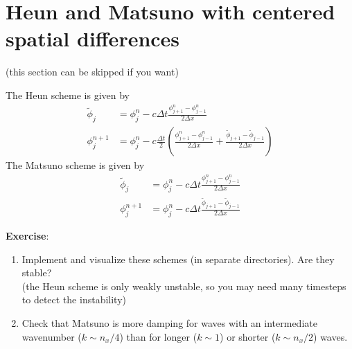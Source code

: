 \documentclass[a4paper]{article}
\begin{document}
\section{Heun and Matsuno with centered spatial differences}
%
\par
(this section can be skipped if you want)
%
\par
The Heun scheme is given by
%
\begin{align*}
	\tilde \phi_j&=\phi_j^n-c\Delta t\frac{\phi^n_{j+1}-\phi^n_{j-1}}{2\Delta x}\\
	\phi^{n+1}_{j}&=\phi_j^n-c\frac{\Delta t}{2}\left(\frac{\phi^n_{j+1}-\phi^n_{j-1}}{2\Delta x}+\frac{\tilde \phi_{j+1}-\tilde \phi_{j-1}}{2\Delta x}\right)
\end{align*}
%
The Matsuno scheme is given by
%
\begin{align*}
	\tilde \phi_j&=\phi_j^n-c\Delta t\frac{\phi^n_{j+1}-\phi^n_{j-1}}{2\Delta x}\\
	\phi^{n+1}_{j}&=\phi_j^n-c\Delta t\frac{\tilde \phi_{j+1}-\tilde \phi_{j-1}}{2\Delta x}
\end{align*}
%
\par\vspace*{3ex}
\textbf{Exercise}:
%
\begin{enumerate}
	\item Implement and visualize these schemes (in separate directories). Are they stable?\\
		(the Heun scheme is only weakly unstable, so you may need many timesteps to detect the instability)
	\item Check that Matsuno is more damping for waves with an intermediate wavenumber ($k\sim n_x/4$) than for longer ($k\sim1$) or shorter ($k\sim n_x/2$) waves.
\end{enumerate}
%
\end{document}
